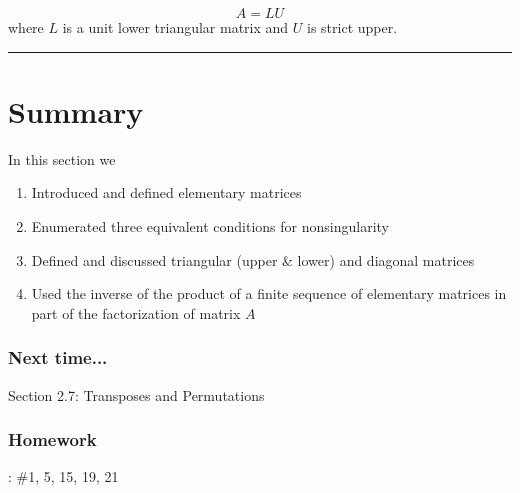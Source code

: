 	 \[   A = LU \]
	 where $L$ is a unit lower triangular matrix and $U$ is strict upper.  

\rule[0.01in]{\textwidth}{0.0025in}








\section*{Summary}


 In this section we 
\begin{enumerate}
	\item Introduced and defined elementary matrices
	\item Enumerated three equivalent conditions for nonsingularity 
	\item Defined and discussed triangular (upper \& lower) and diagonal matrices
	\item Used the inverse of the product of a finite sequence of elementary matrices in part of the factorization of matrix $A$ 
	
	
\end{enumerate}
 




\subsubsection*{Next time...}
Section 2.7: Transposes and Permutations





\subsubsection*{Homework}
: \#1, 5, 15, 19, 21












